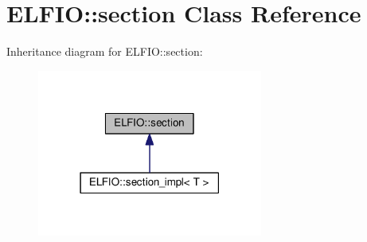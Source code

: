 \hypertarget{class_e_l_f_i_o_1_1section}{}\section{E\+L\+F\+IO\+:\+:section Class Reference}
\label{class_e_l_f_i_o_1_1section}


Inheritance diagram for E\+L\+F\+IO\+:\+:section\+:\nopagebreak
\begin{figure}[H]
\begin{center}
\leavevmode
\includegraphics[width=210pt]{class_e_l_f_i_o_1_1section__inherit__graph}
\end{center}
\end{figure}
